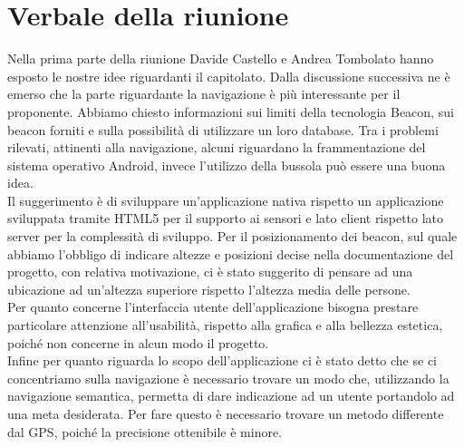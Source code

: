 \documentclass[../Riunione2015-12-21.tex]{subfiles}
\begin{document}
\section{Verbale della riunione}
Nella prima parte della riunione Davide Castello e Andrea Tombolato hanno esposto le nostre idee riguardanti il capitolato. Dalla discussione successiva ne è emerso che la parte riguardante la navigazione è più interessante per il proponente. Abbiamo chiesto informazioni sui limiti della tecnologia Beacon, sui beacon forniti e sulla possibilità di utilizzare un loro database. 
Tra i problemi rilevati, attinenti alla navigazione, alcuni riguardano la frammentazione del sistema operativo Android, invece l'utilizzo della bussola può essere una buona idea. \\ Il suggerimento è di sviluppare un'applicazione nativa rispetto un applicazione sviluppata tramite HTML5 per il supporto ai sensori e lato client rispetto lato server per la complessità di sviluppo.
Per il posizionamento dei beacon, sul quale abbiamo l'obbligo di indicare altezze e posizioni decise nella documentazione del progetto, con relativa motivazione, ci è stato suggerito di pensare ad una ubicazione ad un'altezza superiore rispetto l'altezza media delle persone. \\
Per quanto concerne l'interfaccia utente dell'applicazione bisogna prestare particolare attenzione all'usabilità, rispetto alla grafica e alla bellezza estetica, poiché non concerne in alcun modo il progetto. \\
Infine per quanto riguarda lo scopo dell'applicazione ci è stato detto che se ci concentriamo sulla navigazione è necessario trovare un modo che, utilizzando la navigazione semantica, permetta di dare indicazione ad un utente portandolo ad una meta desiderata. Per fare questo è necessario trovare un metodo differente dal GPS, poiché la precisione ottenibile è minore.
\end{document}
